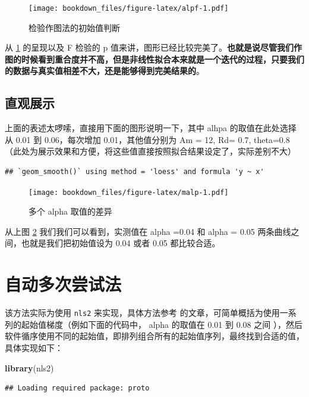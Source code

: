 \documentclass[]{krantz}
\makeatletter
\newenvironment{Shaded}{\begin{snugshade}}{\end{snugshade}}
\newcommand{\KeywordTok}[1]{\textcolor[rgb]{0.13,0.29,0.53}{\textbf{#1}}}
\newcommand{\NormalTok}[1]{#1}
\newenvironment{kframe}{%
\medskip{}
\setlength{\fboxsep}{.8em}
 \def\at@end@of@kframe{}%
 \ifinner\ifhmode%
  \def\at@end@of@kframe{\end{minipage}}%
  \begin{minipage}{\columnwidth}%
 \fi\fi%
 \def\FrameCommand##1{\hskip\@totalleftmargin \hskip-\fboxsep
 \colorbox{shadecolor}{##1}\hskip-\fboxsep
     \hskip-\linewidth \hskip-\@totalleftmargin \hskip\columnwidth}%
 \MakeFramed {\advance\hsize-\width
   \@totalleftmargin\z@ \linewidth\hsize
   \@setminipage}}%
 {\par\unskip\endMakeFramed%
 \at@end@of@kframe}
\renewenvironment{Shaded}{\begin{kframe}}{\end{kframe}}
\theoremstyle{definition}
\theoremstyle{definition}
\theoremstyle{definition}
\theoremstyle{remark}
\makeatother
\begin{document}
\begin{figure}
\centering
\texttt{[image: bookdown\_files/figure-latex/alpf-1.pdf]}
\caption{\label{fig:alpf}检验作图法的初始值判断}
\end{figure}

从 \ref{fig:alpf} 的呈现以及 F 检验的 p
值来讲，图形已经比较完美了。\textbf{也就是说尽管我们作图的时候看到重合度并不高，但是非线性拟合本来就是一个迭代的过程，只要我们的数据与真实值相差不大，还是能够得到完美结果的}。

\subsection{直观展示}

上面的表述太啰嗦，直接用下面的图形说明一下，其中 alhpa
的取值在此处选择从 0.01 到 0.06，每次增加 0.01，其他值分别为 Am = 12,
Rd= 0.7, theta=0.8
（此处为展示效果和方便，将这些值直接按照拟合结果设定了，实际差别不大）

\begin{verbatim}
## `geom_smooth()` using method = 'loess' and formula 'y ~ x'
\end{verbatim}

\begin{figure}
\centering
\texttt{[image: bookdown\_files/figure-latex/malp-1.pdf]}
\caption{\label{fig:malp}多个 alpha 取值的差异}
\end{figure}

从上图 \ref{fig:malp} 我们我们可以看到，实测值在 alpha =0.04 和 alpha =
0.05 两条曲线之间，也就是我们把初始值设为 0.04 或者 0.05 都比较合适。

\section{自动多次尝试法}

该方法实际为使用 \texttt{nls2} 来实现，具体方法参考 \citet{nls2}
的文章，可简单概括为使用一系列的起始值梯度（例如下面的代码中， alpha
的取值在 0.01 到 0.08 之间
），然后软件循序使用不同的起始值，即排列组合所有的起始值序列，最终找到合适的值，具体实现如下：

\begin{Shaded}
\begin{Highlighting}[]
\KeywordTok{library}\NormalTok{(nls2)}
\end{Highlighting}
\end{Shaded}

\begin{verbatim}
## Loading required package: proto
\end{verbatim}
\end{document}

